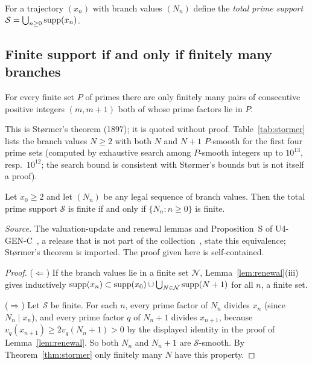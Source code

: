 For a trajectory $(x_n)$ with branch values $(N_n)$ define the \emph{total prime support} $\mathcal S=\bigcup_{n\ge0}\operatorname{supp}(x_n)$.

\subsection{Finite support if and only if finitely many branches}
\begin{theorem}\label{thm:stormer}
For every finite set $P$ of primes there are only finitely many pairs of consecutive positive integers $(m,m+1)$ both of whose prime factors lie in $P$.
\end{theorem}
This is Størmer's theorem (1897); it is quoted without proof. Table~\ref{tab:stormer} lists the branch values $N\ge2$ with both $N$ and $N+1$ $P$-smooth for the first four prime sets (computed by exhaustive search among $P$-smooth integers up to $10^{13}$, resp.\ $10^{12}$; the search bound is consistent with Størmer's bounds but is not itself a proof).
\begin{table}[ht]\centering\small

\caption{Branch values $N\ge2$ such that $N$ and $N+1$ both have all prime factors in $P$ (computed).}\label{tab:stormer}\end{table}

\begin{theorem}\label{thm:D}
Let $x_0\ge2$ and let $(N_n)$ be any legal sequence of branch values. Then the total prime support $\mathcal S$ is finite if and only if $\{N_n:n\ge0\}$ is finite.
\end{theorem}
\noindent\emph{Source.} The valuation-update and renewal lemmas and Proposition~S of U4-GEN-C~\cite{u4genc}, a release that is not part of the collection~\cite{coll}, state this equivalence; Størmer's theorem is imported. The proof given here is self-contained.
\begin{proof}
($\Leftarrow$) If the branch values lie in a finite set $\mathcal N$, Lemma~\ref{lem:renewal}(iii) gives inductively $\operatorname{supp}(x_n)\subset\operatorname{supp}(x_0)\cup\bigcup_{N\in\mathcal N}\operatorname{supp}(N+1)$ for all $n$, a finite set.

($\Rightarrow$) Let $\mathcal S$ be finite. For each $n$, every prime factor of $N_n$ divides $x_n$ (since $N_n\mid x_n$), and every prime factor $q$ of $N_n+1$ divides $x_{n+1}$, because $v_q(x_{n+1})\ge2v_q(N_n+1)>0$ by the displayed identity in the proof of Lemma~\ref{lem:renewal}. So both $N_n$ and $N_n+1$ are $\mathcal S$-smooth. By Theorem~\ref{thm:stormer} only finitely many $N$ have this property. \end{proof}

